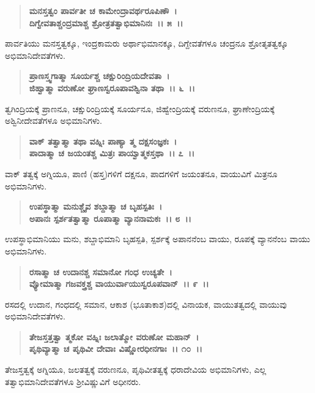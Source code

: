 \begin{verse}
\textbf{ಮನಸ್ತತ್ವಂ ಪಾರ್ವತೀ ಚ ಕಾಮೇಂದ್ರಾವರ್ಥರೂಪಿಣೌ~।}\\\textbf{ದಿಗ್ವೇವತಾಶ್ಚಂದ್ರಮಾಶ್ಚ ಶ್ರೋತ್ರತತ್ವಾಭಿಮಾನಿನಃ~।। ೫~।।}
\end{verse}

ಪಾರ್ವತಿಯು ಮನಸ್ತತ್ವಕ್ಕೂ, ಇಂದ್ರಕಾಮರು ಅರ್ಥಾಭಿಮಾನಕ್ಕೂ, ದಿಗ್ದೇವತೆಗಳೂ ಚಂದ್ರನೂ ಶ್ರೋತೃತತ್ವಕ್ಕೂ ಅಭಿಮಾನಿದೇವತೆಗಳು.

\begin{verse}
\textbf{ಪ್ರಾಣಸ್ತ್ವಗಾತ್ಮಾ ಸೂರ್ಯಶ್ಚ ಚಕ್ಷುರಿಂದ್ರಿಯದೇವತಾ~।}\\\textbf{ಜಿಹ್ವಾತ್ಮಾ ವರುಣೋ ಘ್ರಾಣಸ್ವರೂಪಾವಶ್ವಿನಾ ತಥಾ~।। ೬~।।}
\end{verse}

ತ್ವಗಿಂದ್ರಿಯಕ್ಕೆ ಪ್ರಾಣನೂ, ಚಕ್ಷುರಿಂದ್ರಿಯಕ್ಕೆ ಸೂರ್ಯನೂ, ಜಿಹ್ವೇಂದ್ರಿಯಕ್ಕೆ \break ವರುಣನೂ, ಘ್ರಾಣೇಂದ್ರಿಯಕ್ಕೆ ಅಶ್ವಿನೀದೇವತೆಗಳೂ ಅಭಿಮಾನಿಗಳು.

\begin{verse}
\textbf{ವಾಕ್ ತತ್ವಾತ್ಮಾ ತಥಾ ವಹ್ನಿಃ ಪಾಣ್ಯಾ ತ್ಮ ದಕ್ಷಸಂಜ್ಞಕಃ~।}\\\textbf{ಪಾದಾತ್ಮಾ ಚ ಜಯಂತಶ್ಚ ಮಿತ್ರಃ ಪಾಯ್ವಾತ್ಮಕಸ್ತಥಾ~।। ೭~।।}
\end{verse}

ವಾಕ್ ತತ್ವಕ್ಕೆ ಅಗ್ನಿಯೂ, ಪಾಣಿ (ಹಸ್ತ)ಗಳಿಗೆ ದಕ್ಷನೂ, ಪಾದಗಳಿಗೆ ಜಯಂತನೂ, ವಾಯುವಿಗೆ ಮಿತ್ರನೂ ಅಭಿಮಾನಿಗಳು.

\begin{verse}
\textbf{ಉಪಸ್ಥಾತ್ಮಾ ಮನುಶ್ಚೈವ ಶಬ್ದಾತ್ಮಾ ಚ ಬೃಹಸ್ಪತಿಃ~।}\\\textbf{ಅಪಾನಃ ಸ್ಪರ್ಶತತ್ವಾತ್ಮಾ ರೂಪಾತ್ಮಾ ವ್ಯಾನನಾಮಕಃ~।। ೮~।।}
\end{verse}

ಉಪಸ್ಥಾಭಿಮಾನಿಯು ಮನು, ಶಬ್ದಾಭಿಮಾನಿ ಬೃಹಸ್ಪತಿ, ಸ್ಪರ್ಶಕ್ಕೆ ಅಪಾನನೆಂಬ ವಾಯು, ರೂಪಕ್ಕೆ ವ್ಯಾನನೆಂಬ ವಾಯು ಅಭಿಮಾನಿಗಳು.

\begin{verse}
\textbf{ರಸಾತ್ಮಾ ಚ ಉದಾನಶ್ಚ ಸಮಾನೋ ಗಂಧ ಉಚ್ಯತೇ~।}\\\textbf{ವ್ಯೋಮಾತ್ಮಾ ಗಜವಕ್ತ್ರಶ್ಚ ವಾಯುರ್ವಾಯುಸ್ವರೂಪವಾನ್~।। ೯~।।}
\end{verse}

ರಸದಲ್ಲಿ ಉದಾನ, ಗಂಧದಲ್ಲಿ ಸಮಾನ, ಆಕಾಶ (ಭೂತಾಕಾಶ)ದಲ್ಲಿ ವಿನಾಯಕ, ವಾಯುತತ್ವದಲ್ಲಿ ವಾಯುವು ಅಭಿಮಾನಿದೇವತೆಗಳು.

\begin{verse}
\textbf{ತೇಜಸ್ತತ್ತತ್ವಾ ತ್ಮಕೋ ವಹ್ನಿಃ ಜಲಾತ್ಮೋ ವರುಣೋ ಮಹಾನ್~।}\\\textbf{ಪೃಥಿವ್ಯಾತ್ಮಾ ಚ ಪೃಥಿವೀ ದೇವಾಃ ವಿಷ್ಣೋರಧೀನಗಾಃ~।। ೧೦~।।}
\end{verse}

ತೇಜಸ್ತತ್ವಕ್ಕೆ ಅಗ್ನಿಯೂ, ಜಲತತ್ವಕ್ಕೆ ವರುಣನೂ, ಪೃಥಿವೀತತ್ವಕ್ಕೆ ಧರಾದೇವಿಯ ಅಭಿಮಾನಿಗಳು, ಎಲ್ಲ ತತ್ವಾಭಿಮಾನಿದೇವತೆಗಳೂ ಶ‍್ರೀವಿಷ್ಣುವಿಗೆ ಅಧೀನರು.

